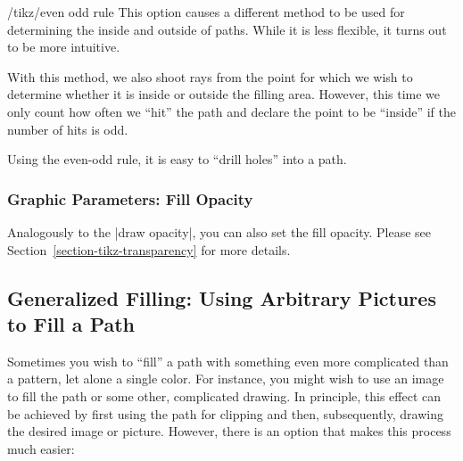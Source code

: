 \begin{key}{/tikz/even odd rule}
  This option causes a different method to be used for determining the
  inside and outside of paths. While it is less flexible, it turns out
  to be more intuitive.

  With this method, we also shoot rays from the point for which we
  wish to determine whether it is inside or outside the filling
  area. However, this time we only count how often we ``hit'' the path
  and declare the point to be ``inside'' if the number of hits is odd.

  Using the even-odd rule, it is easy to ``drill holes'' into a path.

\begin{codeexample}[]
\end{codeexample}
\end{key}



\subsubsection{Graphic Parameters: Fill Opacity}

\label{section-fill-opacity}
Analogously to the |draw opacity|, you can also set the fill opacity. Please see Section~\ref{section-tikz-transparency} for more
details.


\subsection{Generalized Filling: Using Arbitrary Pictures to Fill a Path}

Sometimes you wish to ``fill'' a path with something even more
complicated than a pattern, let alone a single color. For instance,
you might wish to use an image to fill the path or some other,
complicated drawing. In principle, this effect can be achieved
by first using the path for clipping and then, subsequently, drawing
the desired image or picture. However, there is an option that makes
this process much easier:


